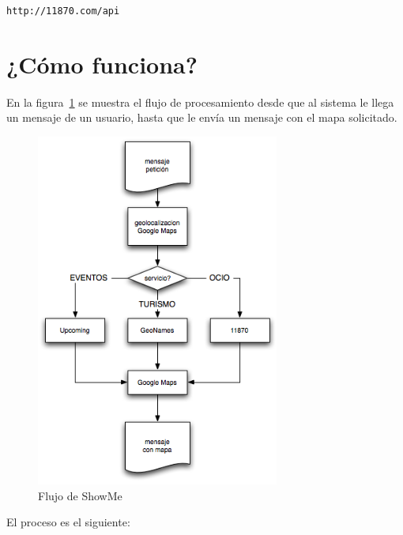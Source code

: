 \documentclass[11pt, a4paper, oneside]{article}
\begin{document}
\texttt{http://11870.com/api}

\section{¿Cómo funciona?} %
\label{sec:_cómo_funciona}

En la figura~\ref{fig:diagrama} se muestra el flujo de procesamiento desde que al sistema le llega un mensaje de un usuario, hasta que le envía un mensaje con el mapa solicitado.

\begin{figure}[htp]
\centering
\includegraphics[width=8cm]{showme_diagram.png}
\caption{Flujo de ShowMe}
\label{fig:diagrama}
\end{figure}

El proceso es el siguiente:
\end{document}
